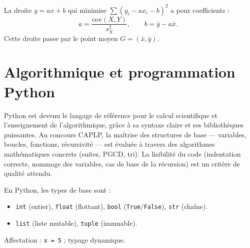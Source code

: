 \documentclass[11pt,a4paper,twoside]{book}
\begin{document}
\begin{theoremebox}
La droite $y = ax + b$ qui minimise $\sum(y_i - ax_i - b)^2$ a pour coefficients :
\[
  a = \frac{\mathrm{cov}(X,Y)}{s_X^2}, \qquad b = \bar{y} - a\bar{x}.
\]
Cette droite passe par le point moyen $G=(\bar{x},\bar{y})$.
\end{theoremebox}

\begin{center}
\end{center}

\section{Algorithmique et programmation Python}

Python est devenu le langage de référence pour le calcul scientifique et l'enseignement de l'algorithmique, grâce à sa syntaxe claire et ses bibliothèques puissantes. Au concours CAPLP, la maîtrise des structures de base — variables, boucles, fonctions, récursivité — est évaluée à travers des algorithmes mathématiques concrets (suites, PGCD, tri). La lisibilité du code (indentation correcte, nommage des variables, cas de base de la récursion) est un critère de qualité attendu.

\begin{definitionbox}
En Python, les types de base sont :
\begin{itemize}
  \item \texttt{int} (entier), \texttt{float} (flottant), \texttt{bool} (\texttt{True}/\texttt{False}), \texttt{str} (chaîne).
  \item \texttt{list} (liste mutable), \texttt{tuple} (immuable).
\end{itemize}
Affectation : \texttt{x = 5} ; typage dynamique.
\end{definitionbox}
\end{document}
